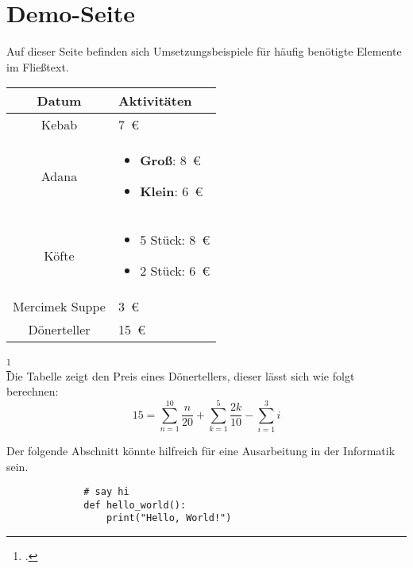 \section{Demo-Seite}
Auf dieser Seite befinden sich Umsetzungsbeispiele für häufig benötigte Elemente im Fließtext.\\

\begin{center}
    \begin{table}[h]
    \centering
    \begin{tabular}{|c|p{6cm}|}
        \hline
        \textbf{Datum} & \textbf{Aktivitäten} \\
        \hline
        Kebab & 7 € \\
        \hline
        Adana & \begin{itemize}
            \item \textbf{Groß}: 8 €
            \item \textbf{Klein}: 6 €
        \end{itemize} \\
        \hline
        Köfte & \begin{itemize}
            \item 5 Stück: 8 €
            \item 2 Stück: 6 €
        \end{itemize}\\
        \hline
        Mercimek Suppe & 3 € \\
        \hline
        Dönerteller & 15 € \\
        \hline
    \end{tabular}
    \label{tab:example}
    \end{table}
\end{center}
\footcitetext[Vgl.][]{DemoQuelle}\\ [-4em]

Die Tabelle zeigt den Preis eines Dönertellers, dieser lässt sich wie folgt berechnen:
\begin{equation}
    15 = \sum_{n=1}^{10} \frac{n}{20} + \sum_{k=1}^{5} \frac{2k}{10} - \sum_{i=1}^{3} i
\end{equation}

\newpage
Der folgende Abschnitt könnte hilfreich für eine Ausarbeitung in der Informatik sein.
\begin{figure}[h]
    \begin{lstlisting}
        # say hi
        def hello_world():
            print("Hello, World!")
    \end{lstlisting}
    \label{fig:meincode}
\end{figure}

